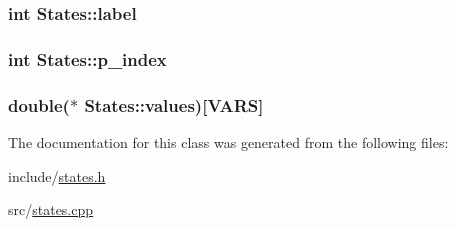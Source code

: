 \subsubsection[{label}]{\setlength{\rightskip}{0pt plus 5cm}int States\+::label}\hypertarget{classStates_ab444a833f85348e8a850962da6c2c987}{}\label{classStates_ab444a833f85348e8a850962da6c2c987}
\subsubsection[{p\+\_\+index}]{\setlength{\rightskip}{0pt plus 5cm}int States\+::p\+\_\+index}\hypertarget{classStates_a13e3842ad77b702e0f68cf875ded9534}{}\label{classStates_a13e3842ad77b702e0f68cf875ded9534}
\subsubsection[{values}]{\setlength{\rightskip}{0pt plus 5cm}double($\ast$ States\+::values)\mbox{[}{\bf V\+A\+RS}\mbox{]}}\hypertarget{classStates_a8b9a87b26c50e560d98c98d7e18f36b4}{}\label{classStates_a8b9a87b26c50e560d98c98d7e18f36b4}


The documentation for this class was generated from the following files\+:\begin{DoxyCompactItemize}
\item 
include/\hyperlink{states_8h}{states.\+h}\item 
src/\hyperlink{states_8cpp}{states.\+cpp}\end{DoxyCompactItemize}
